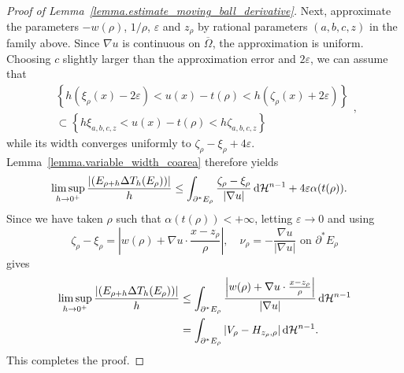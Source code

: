 \documentclass[11pt]{amsart}
\theoremstyle{plain}
\theoremstyle{definition}
\newcommand{\dHn}{\,\dd\mathcal{H}^{n-1}}
\newcommand{\eqdef}{\overset{\text{def.}}{=}}
\def\dd{{\rm d}}
\begin{document}
\begin{proof}[Proof of Lemma~\ref{lemma.estimate_moving_ball_derivative}]
Next, approximate the parameters $-w(\rho)$, $1/\rho$, $\varepsilon$ and $z_\rho$ by rational parameters $(a,b,c,z)$ in the family above. Since $\nabla u$ is continuous on $\overline{\Omega}$, the approximation is uniform. Choosing $c$ slightly larger than the approximation error and $2\varepsilon$, we can assume that 
\[
  \begin{aligned}
    \left\{
          h(\xi_\rho(x)-2\varepsilon)<u(x)-t(\rho)
          <h(\zeta_\rho(x)+2\varepsilon)
    \right\}\\ 
    \subset
    \left\{
            h\xi_{a,b,c,z} 
            < u(x)-t(\rho) < 
      h\zeta_{a,b,c,z}\right\}
  \end{aligned},
\]
while its width converges uniformly to $\zeta_\rho-\xi_\rho+4\varepsilon$. Lemma~\ref{lemma.variable_width_coarea} therefore yields
\begin{align*}
 \limsup_{h\to0^+}
 \frac{|(E_{\rho+h}\Delta T_h(E_\rho))|}{h}
 &\le
 \int_{\partial^*E_\rho}
 \frac{\zeta_\rho-\xi_\rho}{{|\nabla u|}}\dHn
 + 
 4\varepsilon\alpha(t(\rho)).
\end{align*}
Since we have taken $\rho$ such that $\alpha(t(\rho)) < +\infty$, letting $\varepsilon\to0$ and using
\[
 \zeta_\rho-\xi_\rho
 =\left|w(\rho)+\nabla u\cdot\frac{x-z_\rho}{\rho}\right|, 
 \quad 
 \nu_\rho = - \frac{\nabla u}{|\nabla u|} \text{ on } \partial^*E_\rho
\]
gives
\begin{align*}
 \limsup_{h\to0^+}
 \frac{|(E_{\rho+h}\Delta T_h(E_\rho))|}{h}
 &\le
 \int_{\partial^*E_\rho}
 \frac{\left|w(\rho)+\nabla u\cdot\frac{x-z_\rho}{\rho}\right|}
 {|\nabla u|}\dHn\\
 &=\int_{\partial^* E_\rho}
 |V_\rho-H_{z_\rho,\rho}|\dHn.
\end{align*}
This completes the proof.


\end{proof}
\end{document}
